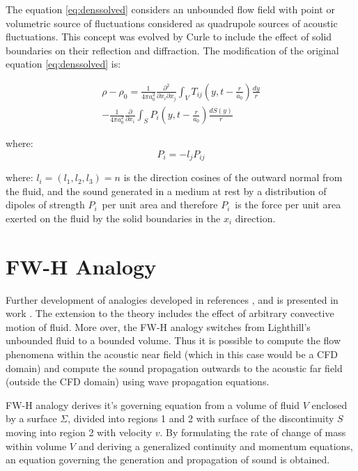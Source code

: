 The equation \ref{eq:denssolved} considers an unbounded flow field with point or volumetric source of fluctuations considered as quadrupole sources of acoustic fluctuations. This concept was evolved by Curle \citep{curle} to include the effect of solid boundaries on their reflection and diffraction. The modification of the original equation \ref{eq:denssolved} is:

\begin{equation} \label{eq:denscurle}
\begin{split}
\rho - \rho_0 = \frac{1}{4 \pi a_0^2} \frac{\partial^2}{\partial x_i \partial x_j}
\int_V T_{ij} \left(y, t - \frac{r}{a_0} \right) \frac{dy}{r} \\
- \frac{1}{4 \pi a_0^2} \frac{\partial}{\partial x_i}
\int_S P_i \left(y, t - \frac{r}{a_0} \right) \frac{dS(y)}{r}
\end{split}
\end{equation}

\noindent where:
\begin{equation} \label{eq:curlePi}
P_i = -l_j P_{ij}
\end{equation}

\noindent where: $l_i = (l_1, l_2, l_3) = n$ is the direction cosines of the outward normal from the fluid, and the sound generated in a medium at rest by a distribution of dipoles of strength $P_i$~per unit area and therefore $P_i$~is the force per unit area exerted on the fluid by the solid boundaries in the $x_i$ direction.



\section{FW-H Analogy}
Further development of analogies developed in references \citep{Light1}, \citep{Light2} and \citep{curle} is presented in work \citep{FWH}. The extension to the theory includes the effect of arbitrary convective motion of fluid. More over, the FW-H analogy switches from Lighthill's unbounded fluid to a bounded volume. Thus it is possible to compute the flow phenomena within the acoustic near field (which in this case would be a CFD domain) and compute the sound propagation outwards to the acoustic far field (outside the CFD domain) using wave propagation equations.

FW-H analogy derives it's governing equation from a volume of fluid $V$ enclosed by a surface $\Sigma$, divided into regions 1 and 2 with surface of the discontinuity $S$ moving into region 2 with velocity $v$. By formulating the rate of change of mass within volume $V$ and deriving a generalized continuity and momentum equations, an equation governing the generation and propagation of sound is obtained.

